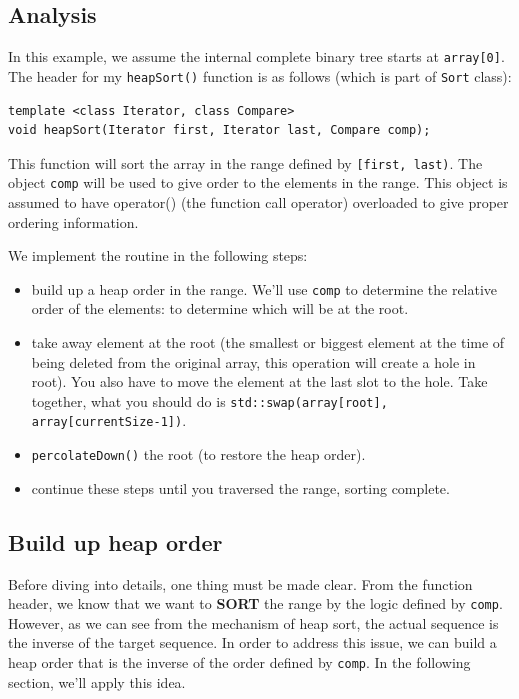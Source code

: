 \documentclass[11pt]{book}
\begin{document}
\subsection{Analysis}
\label{sec:org06925d7}

In this example, we assume the internal complete binary tree starts at \texttt{array[0]}.
The header for my \texttt{heapSort()} function is as follows (which is part of \texttt{Sort} class):
\begin{verbatim}
template <class Iterator, class Compare>
void heapSort(Iterator first, Iterator last, Compare comp);
\end{verbatim}
This function will sort the array in the range defined by \texttt{[first, last)}. The object \texttt{comp} will be used to give order to the elements in the range. This object is assumed to have operator() (the function call operator) overloaded to give proper ordering information.

We implement the routine in the following steps:
\begin{itemize}
\item build up a heap order in the range. We'll use \texttt{comp} to determine the relative order of the elements: to determine which will be at the root.
\item take away element at the root (the smallest or biggest element at the time of being deleted from the original array, this operation will create a hole in root). You also have to move the element at the last slot to the hole. Take together, what you should do is \texttt{std::swap(array[root], array[currentSize-1])}.
\item \texttt{percolateDown()} the root (to restore the heap order).
\item continue these steps until you traversed the range, sorting complete.
\end{itemize}
\subsection{Build up heap order}
\label{sec:org6c98963}

Before diving into details, one thing must be made clear. From the function header, we know that we want to \textbf{SORT} the range by the logic defined by \texttt{comp}. However, as we can see from the mechanism of heap sort, the actual sequence is the inverse of the target sequence. In order to address this issue, we can build a heap order that is the inverse of the order defined by \texttt{comp}. In the following section, we'll apply this idea.
\end{document}
